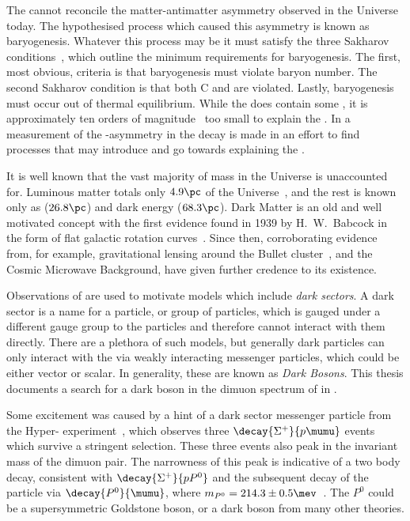 The \sm cannot reconcile the matter-antimatter asymmetry observed in the
Universe today.
The hypothesised process which caused this asymmetry is known as baryogenesis.
Whatever this process may be it must satisfy the three Sakharov
conditions~\cite{1991SvPhU..34..392S}, which outline the minimum requirements for baryogenesis.
The first, most obvious, criteria is that baryogenesis must violate baryon number.
The second Sakharov condition is that both \gls{C} and \CP are violated.
Lastly, baryogenesis must occur out of thermal equilibrium.
While the \sm does contain  some \CPV, it is approximately ten orders of
magnitude~\cite{Cline:2006ts,Huet:1994jb} too small to explain the \BAU.
In  a measurement of the \CP-asymmetry in the decay \btodsphi is made in an effort
to find \np processes that may introduce \CPV and go towards explaining the \BAU.


It is well known that the vast majority of mass in the Universe is unaccounted for.
Luminous matter totals only \approx$4.9\pc$ of the Universe~\cite{Adam:2015rua,PDG2014}, and the rest
is known only as \dm (\approx$26.8\pc$) and dark energy (\approx$68.3\pc$).
Dark Matter is an old and well motivated concept with the first evidence found in 1939 by H.~W.~Babcock
in the form of flat galactic rotation curves~\cite{1970ApJ...159..379R,1980ApJ...238..471R}.
Since then, corroborating evidence from, for example, gravitational lensing around the Bullet
cluster~\cite{Markevitch:2003at}, and the Cosmic Microwave Background, have given further credence
to its existence.


Observations of \dm are used to motivate \np models which include \emph{dark sectors}.
A dark sector is a name for a particle, or group of particles, which is gauged under a
different gauge group to the \sm particles and therefore cannot interact with them directly.
There are a plethora of such models, but generally dark particles can only interact with the \sm
via weakly interacting messenger particles, which could be either vector or scalar.
In generality, these are known as \emph{Dark Bosons}.
This thesis documents a search for a dark boson in the dimuon spectrum of \btokstrmumu in
.

Some excitement was caused by a hint of a dark sector messenger particle from the Hyper-\CP
experiment~\cite{Burnstein:2004uk}, which observes three $\decay{\Sigma^+}{p\mumu}$ events which
survive a stringent selection.
These three events also peak in the invariant mass of the dimuon pair.
The narrowness of this peak is indicative of a two body decay, consistent with
$\decay{\Sigma^+}{pP^0}$ and the subsequent decay of the \np particle via $\decay{P^0}{\mumu}$,
where $m_{P^0}=214.3\pm0.5\mev$~\cite{Park:2005eka}.
The $P^0$ could be a supersymmetric Goldstone boson, or a dark boson from many other theories.



